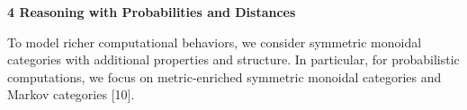  


 
\par\medskip\noindent\textbf{4 Reasoning with Probabilities and Distances}\par
 
 
To model richer computational behaviors, we consider symmetric monoidal categories with additional properties and structure. In particular, for probabilistic computations, we focus on metric-enriched symmetric monoidal categories and Markov categories [10].\par
 
 
  
